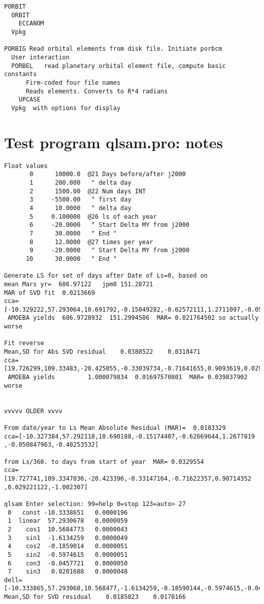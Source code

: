 \documentclass[draft]{article}
\begin{document}
\begin{verbatim}
PORBIT
  ORBIT
    ECCANOM
  Vpkg

PORBIG Read orbital elements from disk file. Initiate porbcm
  User interaction
  PORBEL   read planetary orbital element file, compute basic constants
      Firm-coded four file names
      Reads elements. Converts to R*4 radians
    UPCASE
  Vpkg  with options for display
\end{verbatim}

\section{Test program qlsam.pro: notes}
\vspace{-3.mm} 
\begin{verbatim}
Float values
       0      10000.0  @21 Days before/after j2000
       1      200.000   " delta day
       2      1500.00  @22 Num days INT
       3     -5500.00   " first day
       4      10.0000   " delta day
       5     0.100000  @26 ls of each year
       6     -20.0000   " Start Delta MY from j2000
       7      30.0000   " End "
       8      12.0000  @27 times per year
       9     -20.0000   " Start Delta MY from j2000
      10      30.0000   " End "

Generate LS for set of days after Date of Ls=0, based on 
mean Mars yr=  686.97122   jpm0 151.28721
MAR of SVD fit  0.0213669  
cca=[-10.329222,57.293064,10.691792,-0.15049282,-0.62572111,1.2711097,-0.05001682,-0.41212631]
 AMOEBA yields  686.9728932  151.2994586  MAR= 0.021764502 so actually worse

Fit reverse
Mean,SD for Abs SVD residual    0.0388522    0.0318471
cca=[19.726299,109.33483,-20.425055,-0.33039734,-0.71641655,0.9093619,0.029254431,-0.9966046]
 AMOEBA yields         1.000079834  0.01697570801  MAR= 0.039837902 worse


vvvvv OLDER vvvv

From date/year to Ls Mean Absolute Residual (MAR)=  0.0183329
cca=[-10.327384,57.292118,10.690188,-0.15174407,-0.62669644,1.2677819
,-0.050847963,-0.40253532]

from Ls/360. to days from start of year  MAR= 0.0329554
cca=[19.727741,109.3347036,-20.423396,-0.33147164,-0.71622357,0.90714352 
,0.029221122,-1.002307]

qlsam Enter selection: 99=help 0=stop 123=auto> 27
 0   const -10.3338651   0.0000196
 1  linear  57.2930678   0.0000059
 2    cos1  10.5684773   0.0000043
 3    sin1  -1.6134259   0.0000049
 4    cos2  -0.1859014   0.0000051
 5    sin2  -0.5974615   0.0000051
 6    con3  -0.0457721   0.0000050
 7    sin3   0.0201688   0.0000048
dell=[-10.333865,57.293068,10.568477,-1.6134259,-0.18590144,-0.5974615,-0.045772095,0.020168757]
Mean,SD for SVD residual    0.0185023    0.0170166


\end{verbatim}
\end{document}
